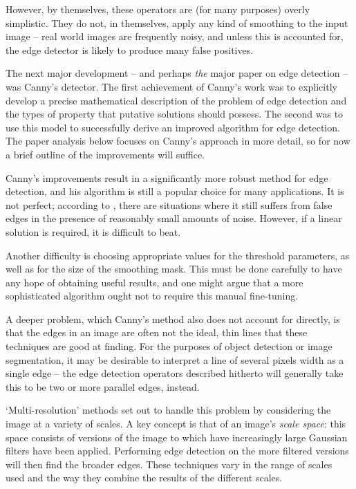 \documentclass{acm_proc_article-sp}
\begin{document}
However, by themselves, these operators are (for many purposes) overly
simplistic. They do not, in themselves, apply any kind of smoothing to the
input image -- real world images are frequently noisy, and unless this is
accounted for, the edge detector is likely to produce many false positives.


The next major development -- and perhaps \emph{the} major paper on edge
detection -- was Canny's detector\cite{4767851}. The first achievement of Canny's work was to
explicitly develop a precise mathematical description of the problem of edge
detection and the types of property that putative solutions should possess. The
second was to use this model to successfully derive an improved algorithm for
edge detection. The paper analysis below focuses on Canny's approach in more
detail, so for now a brief outline of the improvements will suffice.


Canny's improvements result in a significantly more robust method for edge
detection, and his algorithm is still a popular choice for many applications.
It is not perfect; according to \cite{1097737}, there are situations where it
still suffers from false edges in the presence of reasonably small amounts of
noise.  However, if a linear solution is required, it is difficult to beat.

Another difficulty is choosing appropriate values for the threshold parameters,
as well as for the size of the smoothing mask. This must be done carefully to
have any hope of obtaining useful results, and one might argue that a more
sophisticated algorithm ought not to require this manual fine-tuning.

A deeper problem, which Canny's method also does not account for directly, is
that the edges in an image are often not the ideal, thin lines that these
techniques are good at finding. For the purposes of object detection or image
segmentation, it may be desirable to interpret a line of several pixels width
as a single edge -- the edge detection operators described hitherto will
generally take this to be two or more parallel edges, instead.

`Multi-resolution' methods set out to handle this problem by considering the
image at a variety of scales. A key concept is that of an image's \emph{scale
space}: this space consists of versions of the image to which have increasingly
large Gaussian filters have been applied. Performing edge detection on the more
filtered versions will then find the broader edges. These techniques vary in
the range of scales used and the way they combine the results of the different
scales.
\end{document}
